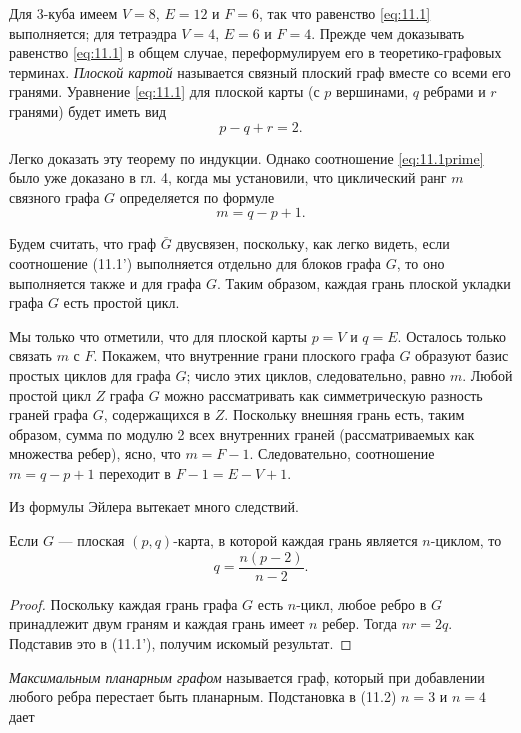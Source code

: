 Для 3-куба имеем $V=8$, $E=12$ и $F=6$, так что равенство \eqref{eq:11.1} выполняется; для тетраэдра $V=4$, $E=6$ и $F=4$. Прежде чем доказывать равенство \eqref{eq:11.1} в общем случае, переформулируем его в теоретико-графовых терминах. \textit{Плоской картой} называется связный плоский граф вместе со всеми его гранями. Уравнение \eqref{eq:11.1} для плоской карты (с $p$ вершинами, $q$ ребрами и $r$ гранями) будет иметь вид
\begin{equation} \label{eq:11.1prime}
p-q+r=2.
\end{equation}

Легко доказать эту теорему по индукции. Однако соотношение \eqref{eq:11.1prime} было уже доказано в гл. 4, когда мы установили, что циклический ранг $m$ связного графа $G$ определяется по формуле
\[
m=q-p+1.
\]

Будем считать, что граф $\bar{G}$ двусвязен, поскольку, как легко видеть, если соотношение (11.1') выполняется отдельно для блоков графа $G$, то оно выполняется также и для графа $G$. Таким образом, каждая грань плоской укладки графа $G$ есть простой цикл.

Мы только что отметили, что для плоской карты $p=V$ и $q=E$. Осталось только связать $m$ с $F$. Покажем, что внутренние грани плоского графа $G$ образуют базис простых циклов для графа $G$; число этих циклов, следовательно, равно $m$. Любой простой цикл $Z$ графа $G$ можно рассматривать как симметрическую разность граней графа $G$, содержащихся в $Z$. Поскольку внешняя грань есть, таким образом, сумма по модулю 2 всех внутренних граней (рассматриваемых как множества ребер), ясно, что $m=F-1$. Следовательно, соотношение $m=q-p+1$ переходит в $F-1=E-V+1$.

Из формулы Эйлера вытекает много следствий.

\begin{corollary}[11.1 (а)] Если $G$ --- плоская $(p,q)$-карта, в которой каждая грань является $n$-циклом, то \begin{equation} \label{eq:11.2} q=\frac{n(p-2)}{n-2}. \end{equation} \end{corollary}

\begin{proof} Поскольку каждая грань графа $G$ есть $n$-цикл, любое ребро в $G$ принадлежит двум граням и каждая грань имеет $n$ ребер. Тогда $nr=2q$. Подставив это в (11.1'), получим искомый результат. \end{proof}

\textit{Максимальным планарным графом} называется граф, который при добавлении любого ребра перестает быть планарным. Подстановка в (11.2) $n=3$ и $n=4$ дает

